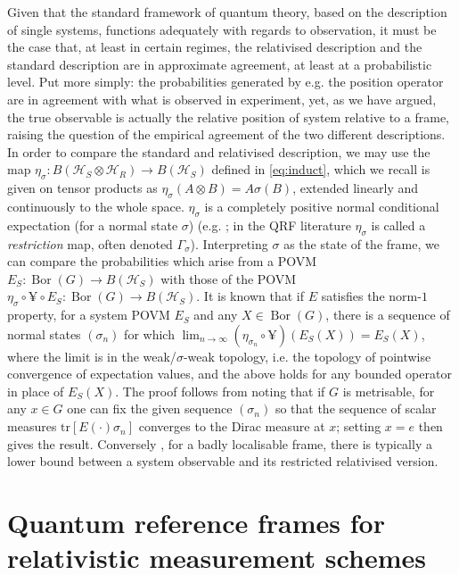 \documentclass[sn-mathphys-num]{sn-jnl}%
\DeclareMathOperator{\Bor}{Bor}
\numberwithin{equation}{section}
\theoremstyle{thmstyleone}%
\theoremstyle{thmstyletwo}%
\theoremstyle{thmstylethree}%
\begin{document}
 Given that the standard 
framework of quantum theory, based on the description of single 
systems, functions adequately with regards to observation, 
it must be the case that, at least in certain regimes, the 
relativised description and the standard description are in approximate agreement, at least at a probabilistic level. Put more simply: 
the probabilities generated by e.g. the position operator are in agreement with what is observed in experiment, yet, as we have 
argued, the true observable is actually the relative position of 
system relative to a frame, raising the question of the empirical agreement of the two different descriptions. In order to compare the standard and relativised description, we may use the map $\eta_{\sigma}:B(\mathcal{H}_S \otimes \mathcal{H}_R)\to B(\mathcal{H}_S)$ defined in \eqref{eq:induct}, which we recall is given on tensor products as $\eta_{\sigma}(A \otimes B)= A \sigma(B)$, extended linearly and continuously to the whole space. $\eta_{\sigma}$ is a completely
positive normal conditional expectation (for a normal state $\sigma$) (e.g. \cite{Loveridge2017a}; in the QRF literature $\eta_{\sigma}$ is called a \emph{restriction} map, often denoted $\Gamma_{\sigma}$). Interpreting $\sigma$ as the state of the frame, we can compare the probabilities which arise from a POVM $E_S:\Bor(G)\to B(\mathcal{H}_S)$ with those of the POVM $\eta_{\sigma} \circ \yen \circ E_S :\Bor(G)\to B(\mathcal{H}_S)$. It is known \cite{Loveridge2017a,carette2023operational} that if $E$ satisfies the norm-$1$ property, for a system POVM $E_S$ and any $X \in \Bor(G)$, there is a sequence of normal states $(\sigma_n)$ for which $\lim_{n \to \infty} (\eta_{\sigma_n} \circ \yen)(E_S(X))=E_S(X)$, where the limit is in the weak/$\sigma$-weak topology, i.e. the topology of pointwise convergence of expectation values, and the above holds for any bounded operator in place of $E_S(X)$. The proof follows from noting that if $G$ is metrisable, for any $x \in G$ one can fix the given 
sequence $(\sigma_n)$ so that the sequence of scalar measures 
$\mathrm{tr} [E(\cdot)\sigma_n]$ converges to the Dirac measure at $x$; 
setting $x=e$ then gives the result. Conversely \cite{miyadera2016approximating}, for a badly localisable frame, there is typically a lower bound between a system observable and its restricted relativised version.


\section{Quantum reference frames for relativistic measurement schemes}
\label{sec:qrf and measurement}
\end{document}
